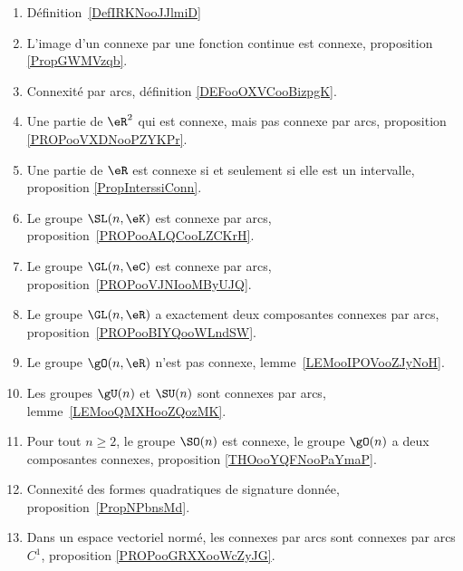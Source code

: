 
\begin{enumerate}
	\item
	      Définition~\ref{DefIRKNooJJlmiD}
	\item
	      L'image d'un connexe par une fonction continue est connexe, proposition \ref{PropGWMVzqb}.
	\item
	      Connexité par arcs, définition \ref{DEFooOXVCooBizpgK}.
	\item
	      Une partie de \( \eR^2\) qui est connexe, mais pas connexe par arcs, proposition \ref{PROPooVXDNooPZYKPr}.
	\item
	      Une partie de \( \eR\) est connexe si et seulement si elle est un intervalle, proposition \ref{PropInterssiConn}.
	\item
	      Le groupe \( \SL(n,\eK)\) est connexe par arcs, proposition~\ref{PROPooALQCooLZCKrH}.
	\item
	      Le groupe \( \GL(n,\eC)\) est connexe par arcs, proposition~\ref{PROPooVJNIooMByUJQ}.
	\item
	      Le groupe \( \GL(n,\eR)\) a exactement deux composantes connexes par arcs, proposition~\ref{PROPooBIYQooWLndSW}.
	\item
	      Le groupe \( \gO(n,\eR)\) n'est pas connexe, lemme~\ref{LEMooIPOVooZJyNoH}.
	\item
	      Les groupes \( \gU(n)\) et \( \SU(n)\) sont connexes par arcs, lemme~\ref{LEMooQMXHooZQozMK}.
	\item
	      Pour tout \( n\geq 2\), le groupe \( \SO(n)\) est connexe, le groupe \( \gO(n)\) a deux composantes connexes, proposition \ref{THOooYQFNooPaYmaP}.
	\item
	      Connexité des formes quadratiques de signature donnée, proposition~\ref{PropNPbnsMd}.
      \item
          Dans un espace vectoriel normé, les connexes par arcs sont connexes par arcs \( C^1\), proposition \ref{PROPooGRXXooWcZyJG}.
\end{enumerate}

